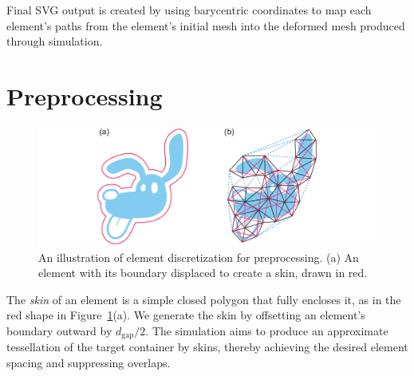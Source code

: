 Final SVG output is created by using barycentric coordinates to map each element's
paths from the element's initial mesh into the deformed mesh produced through
simulation. 


\section{Preprocessing}
\label{repulsionpak_preprocessing}

\begin{figure} %
\centering
\includegraphics[width=1.0\textwidth]{figures/repulsionpak/element_skin_triangles_3.pdf}
\caption[Element discretization]{
	\label{fig_elements_image}
	An illustration of element discretization for preprocessing.
	(a) An element with its boundary displaced to create a skin, drawn in red.
}
\end{figure}




The \textit{skin} of an element is a simple closed polygon 
that fully encloses it, 
as in the red shape in Figure~\ref{fig_elements_image}(a).
We generate the skin 
by offsetting 
an element's boundary outward by $d_\mathrm{gap}/2$. 
The simulation aims to produce an approximate tessellation of the target
container by  skins, thereby achieving the desired element spacing and
suppressing overlaps.


